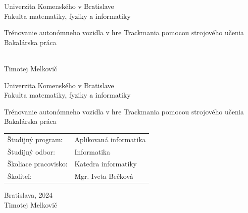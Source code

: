 \documentclass[12pt, twoside]{book}
\def\mfrok{2024}
\def\mfnazov{Trénovanie autonómneho vozidla v hre Trackmania pomocou strojového učenia}
\def\mftyp{Bakalárska práca}
\def\mfautor{Timotej Melkovič}
\def\mfskolitel{Mgr. Iveta Bečková}
\def\mfkonzultant{tit. Meno Priezvisko, tit. }
\def\mfmiesto{Bratislava, \mfrok}
\def\mfodbor{ Informatika }
\def\program{ Aplikovaná informatika }
\def\mfpracovisko{ Katedra informatiky }
\begin{document}
 


\frontmatter
\pagestyle{empty}


\begin{center}
\sc\large
Univerzita Komenského v Bratislave\\
Fakulta matematiky, fyziky a informatiky

\vfill

{\LARGE\mfnazov}\\
\mftyp
\end{center}

\vfill

{\sc\large 
\noindent \mfrok\\
\mfautor
}

\cleardoublepage



\noindent

\begin{center}
\sc  
\large
Univerzita Komenského v Bratislave\\
Fakulta matematiky, fyziky a informatiky

\vfill

{\LARGE\mfnazov}\\
\mftyp
\end{center}

\vfill

\noindent
\begin{tabular}{ll}
Študijný program: & \program \\
Študijný odbor: & \mfodbor \\
Školiace pracovisko: & \mfpracovisko \\
Školiteľ: & \mfskolitel \\
\end{tabular}

\vfill


\noindent \mfmiesto\\
\mfautor

\cleardoublepage



\newpage 
\setcounter{page}{1}

\end{document}

